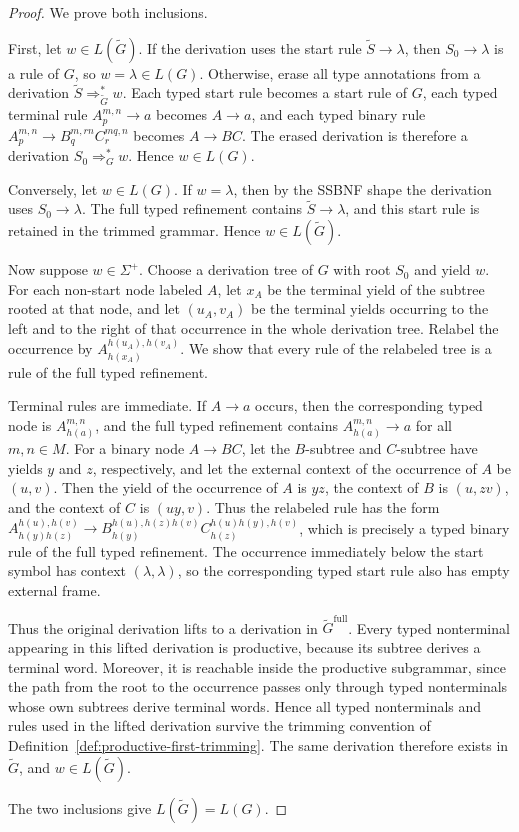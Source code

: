 \documentclass[sub]{jalc}
\newcommand{\Gfull}{\widetilde G^{\mathrm{full}}}
\newcommand{\Gtrim}{\widetilde G}
\begin{document}
\begin{proof}
We prove both inclusions.

First, let \(w\in L(\Gtrim)\). If the derivation uses the start rule \(\widetilde S\to\lambda\), then \(S_0\to\lambda\) is a rule of \(G\), so \(w=\lambda\in L(G)\). Otherwise, erase all type annotations from a derivation \(\widetilde S\Rightarrow_{\Gtrim}^* w\). Each typed start rule becomes a start rule of \(G\), each typed terminal rule \(A_p^{m,n}\to a\) becomes \(A\to a\), and each typed binary rule \(A_p^{m,n}\to B_q^{m,rn}C_r^{mq,n}\) becomes \(A\to BC\). The erased derivation is therefore a derivation \(S_0\Rightarrow_G^*w\). Hence \(w\in L(G)\).

Conversely, let \(w\in L(G)\). If \(w=\lambda\), then by the SSBNF shape the derivation uses \(S_0\to\lambda\). The full typed refinement contains \(\widetilde S\to\lambda\), and this start rule is retained in the trimmed grammar. Hence \(w\in L(\Gtrim)\).

Now suppose \(w\in\Sigma^+\). Choose a derivation tree of \(G\) with root \(S_0\) and yield \(w\). For each non-start node labeled \(A\), let \(x_A\) be the terminal yield of the subtree rooted at that node, and let \((u_A,v_A)\) be the terminal yields occurring to the left and to the right of that occurrence in the whole derivation tree. Relabel the occurrence by \(A_{h(x_A)}^{h(u_A),h(v_A)}\). We show that every rule of the relabeled tree is a rule of the full typed refinement.

Terminal rules are immediate. If \(A\to a\) occurs, then the corresponding typed node is \(A_{h(a)}^{m,n}\), and the full typed refinement contains \(A_{h(a)}^{m,n}\to a\) for all \(m,n\in M\). For a binary node \(A\to BC\), let the \(B\)-subtree and \(C\)-subtree have yields \(y\) and \(z\), respectively, and let the external context of the occurrence of \(A\) be \((u,v)\). Then the yield of the occurrence of \(A\) is \(yz\), the context of \(B\) is \((u,zv)\), and the context of \(C\) is \((uy,v)\). Thus the relabeled rule has the form \(A_{h(y)h(z)}^{h(u),h(v)}\to B_{h(y)}^{h(u),h(z)h(v)} C_{h(z)}^{h(u)h(y),h(v)}\), which is precisely a typed binary rule of the full typed refinement. The occurrence immediately below the start symbol has context \((\lambda,\lambda)\), so the corresponding typed start rule also has empty external frame.

Thus the original derivation lifts to a derivation in \(\Gfull\). Every typed nonterminal appearing in this lifted derivation is productive, because its subtree derives a terminal word. Moreover, it is reachable inside the productive subgrammar, since the path from the root to the occurrence passes only through typed nonterminals whose own subtrees derive terminal words. Hence all typed nonterminals and rules used in the lifted derivation survive the trimming convention of Definition~\ref{def:productive-first-trimming}. The same derivation therefore exists in \(\Gtrim\), and \(w\in L(\Gtrim)\).

The two inclusions give \(L(\Gtrim)=L(G)\).
\end{proof}
\end{document}
